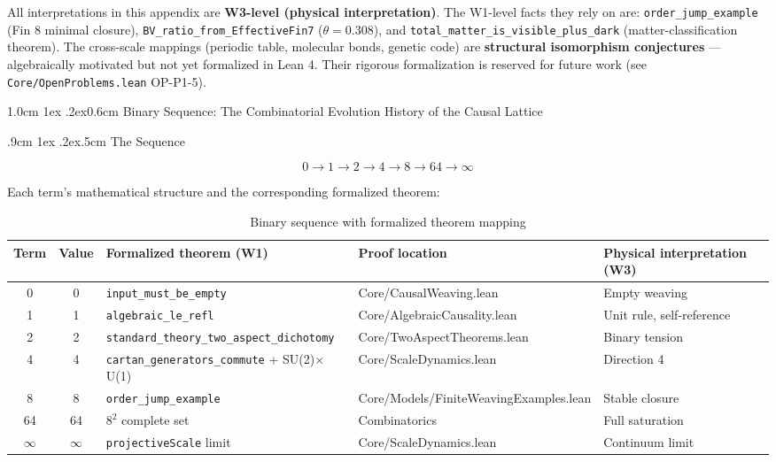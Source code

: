 \documentclass[aps,prd,twocolumn,nofootinbib,floatfix]{revtex4-2}
\makeatletter
\def\section{%
  \@startsection{section}{1}{\z@}
    {1.0cm \@plus1ex \@minus .2ex}{0.6cm}
    {\normalfont\large\bfseries\centering}%
}
\def\subsection{%
  \@startsection{subsection}{2}{\z@}
    {.9cm \@plus1ex \@minus .2ex}{.5cm}
    {\normalfont\normalsize\bfseries\centering}%
}
\makeatother
\begin{document}
All interpretations in this appendix are \textbf{W3-level (physical interpretation)}. The W1-level facts they rely on are: \texttt{order\_jump\_example} (Fin 8 minimal closure), \texttt{BV\_ratio\_from\_EffectiveFin7} ($\theta = 0.308$), and \texttt{total\_matter\_is\_visible\_plus\_dark} (matter-classification theorem). The cross-scale mappings (periodic table, molecular bonds, genetic code) are \textbf{structural isomorphism conjectures} --- algebraically motivated but not yet formalized in Lean 4. Their rigorous formalization is reserved for future work (see \texttt{Core/OpenProblems.lean} OP-P1-5).

\section{Binary Sequence: The Combinatorial Evolution History of the Causal Lattice}

\subsection{The Sequence}

\[
\boxed{
0 \longrightarrow 1 \longrightarrow 2 \longrightarrow 4 \longrightarrow 8 \longrightarrow 64 \longrightarrow \infty
}
\]

Each term's mathematical structure and the corresponding formalized theorem:

\begin{table}[!t]
\centering
\scriptsize
\begin{tabular}{|c|c|l|l|l|}
\hline
Term & Value & Formalized theorem (W1) & Proof location & Physical interpretation (W3) \\
\hline
0 & 0 & \texttt{input\_must\_be\_empty} & Core/CausalWeaving.lean & Empty weaving \\
1 & 1 & \texttt{algebraic\_le\_refl} & Core/AlgebraicCausality.lean & Unit rule, self-reference \\
2 & 2 & \texttt{standard\_theory\_two\_aspect\_dichotomy} & Core/TwoAspectTheorems.lean & Binary tension \\
4 & 4 & \texttt{cartan\_generators\_commute} + SU(2)$\times$U(1) & Core/ScaleDynamics.lean & Direction 4 \\
8 & 8 & \texttt{order\_jump\_example} & Core/Models/FiniteWeavingExamples.lean & Stable closure \\
64 & 64 & $8^2$ complete set & Combinatorics & Full saturation \\
$\infty$ & $\infty$ & \texttt{projectiveScale} limit & Core/ScaleDynamics.lean & Continuum limit \\
\hline
\end{tabular}
\caption{Binary sequence with formalized theorem mapping}
\end{table}
\end{document}
